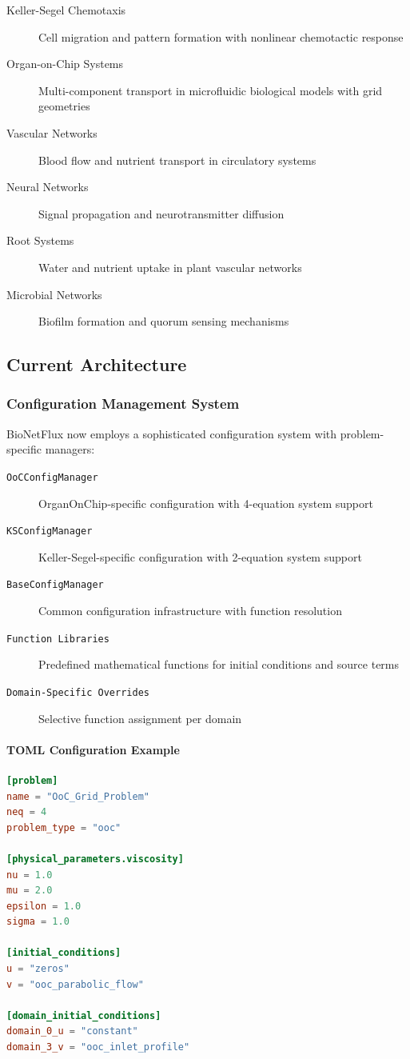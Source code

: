 \begin{description}
    \item[Keller-Segel Chemotaxis] Cell migration and pattern formation with nonlinear chemotactic response
    \item[Organ-on-Chip Systems] Multi-component transport in microfluidic biological models with grid geometries
    \item[Vascular Networks] Blood flow and nutrient transport in circulatory systems
    \item[Neural Networks] Signal propagation and neurotransmitter diffusion
    \item[Root Systems] Water and nutrient uptake in plant vascular networks
    \item[Microbial Networks] Biofilm formation and quorum sensing mechanisms
\end{description}

\subsection{Current Architecture}

\subsubsection{Configuration Management System}

BioNetFlux now employs a sophisticated configuration system with problem-specific managers:

\begin{description}
    \item[\texttt{OoCConfigManager}] OrganOnChip-specific configuration with 4-equation system support
    \item[\texttt{KSConfigManager}] Keller-Segel-specific configuration with 2-equation system support
    \item[\texttt{BaseConfigManager}] Common configuration infrastructure with function resolution
    \item[\texttt{Function Libraries}] Predefined mathematical functions for initial conditions and source terms
    \item[\texttt{Domain-Specific Overrides}] Selective function assignment per domain
\end{description}

\paragraph{TOML Configuration Example}
\begin{lstlisting}[language=toml, caption=Current Configuration System]
[problem]
name = "OoC_Grid_Problem"
neq = 4
problem_type = "ooc"

[physical_parameters.viscosity]
nu = 1.0
mu = 2.0
epsilon = 1.0
sigma = 1.0

[initial_conditions]
u = "zeros"
v = "ooc_parabolic_flow"

[domain_initial_conditions]
domain_0_u = "constant"
domain_3_v = "ooc_inlet_profile"
\end{lstlisting}

